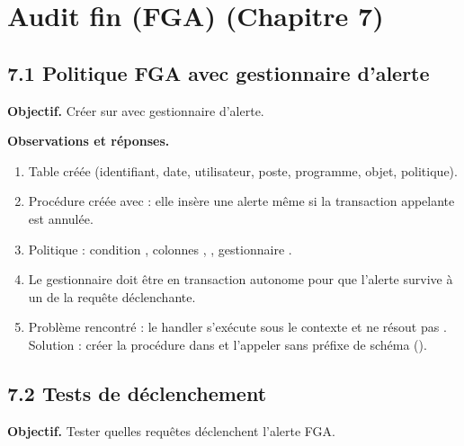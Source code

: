 \section{Audit fin (FGA) (Chapitre 7)}

\subsection{7.1 Politique FGA avec gestionnaire d'alerte}
\textbf{Objectif.} Créer  sur  avec gestionnaire d'alerte.


\textbf{Observations et réponses.}
\begin{enumerate}
  \item Table  créée (identifiant, date, utilisateur, poste, programme, objet, politique).
  \item Procédure  créée avec  : elle insère une alerte même si la transaction appelante est annulée.
  \item Politique  : condition , colonnes , , gestionnaire .
  \item Le gestionnaire doit être en transaction autonome pour que l'alerte survive à un  de la requête déclenchante.
  \item Problème rencontré : le handler s'exécute sous le contexte  et ne résout pas . Solution : créer la procédure dans  et l'appeler sans préfixe de schéma ().
\end{enumerate}

\subsection{7.2 Tests de déclenchement}
\textbf{Objectif.} Tester quelles requêtes déclenchent l'alerte FGA.

 

